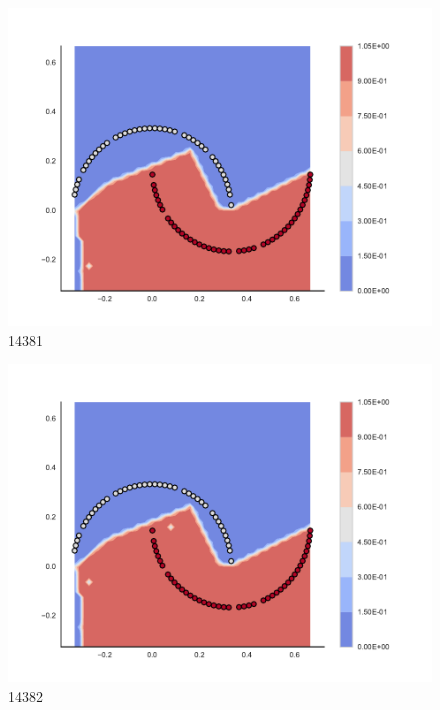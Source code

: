 \begin{subfigure}[b]{0.09\textwidth}
    \includegraphics[clip, trim=2.35cm 1.75cm 4.5cm 0cm,width=\textwidth]{img/convergence/14381.pdf}
    \caption{14381}
    \label{fig:convergence_14381}
\end{subfigure}
%
\begin{subfigure}[b]{0.09\textwidth}
    \includegraphics[clip, trim=2.35cm 1.75cm 4.5cm 0cm,width=\textwidth]{img/convergence/14382.pdf}
    \caption{14382}
    \label{fig:convergence_14382}
\end{subfigure}
%
